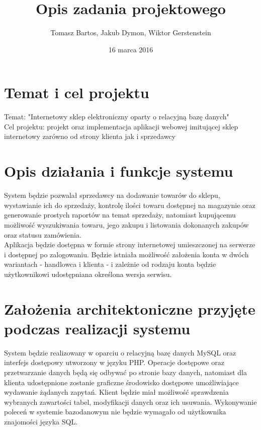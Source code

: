 \documentclass[a4paper, 11pt]{article}
\title{Opis zadania projektowego}
\author{Tomasz Bartos, Jakub Dymon, Wiktor Gerstenstein}
\date{16 marca 2016}
\begin{document}
\maketitle
\section{Temat i cel projektu}
Temat: "Internetowy sklep elektroniczny oparty o relacyjną bazę danych"\\
Cel projektu: projekt oraz implementacja aplikacji webowej imitującej sklep internetowy zarówno od strony klienta jak i sprzedawcy
\section{Opis działania i funkcje systemu}
System będzie pozwalał sprzedawcy na dodawanie towarów do sklepu, wystawianie ich do sprzedaży, kontrolę ilości towaru dostępnej na magazynie oraz generowanie prostych raportów na temat sprzedaży, natomiast kupującemu możliwość wyszukiwania towaru, jego zakupu i listowania dokonanych zakupów oraz statusu zamówienia.\\
Aplikacja będzie dostępna w formie strony internetowej umieszczonej na serwerze i dostępnej po zalogowaniu. Będzie istniała możliwość założenia konta w dwóch wariantach - handlowca i klienta - i zależnie od rodzaju konta będzie użytkownikowi udostępniana określona wersja serwisu.
\section{Założenia architektoniczne przyjęte podczas realizacji systemu}
System będzie realizowany w oparciu o relacyjną bazę danych MySQL oraz interfejs dostępowy utworzony w języku PHP. Operacje dostępowe oraz przetwarzanie danych będą się odbywać po stronie bazy danych, natomiast dla klienta udostępnione zostanie graficzne środowisko dostępowe umożliwiające wydawanie żądanych zapytań. Klient będzie miał możliwość sprawdzenia wybranych zawartości tabel, modyfikacji danych oraz ich usuwania. Wykonywanie poleceń w systemie bazodanowym nie będzie wymagało od użytkownika znajomości języka SQL.
\end{document}
